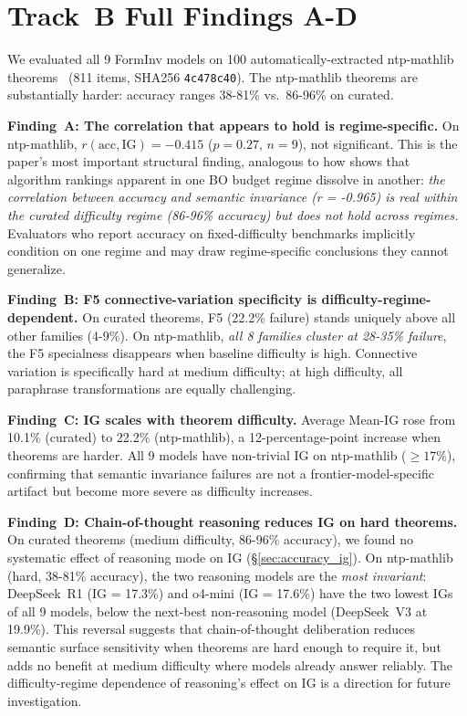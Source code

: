 \documentclass{article}
\begin{document}
\section{Track~B Full Findings A-D}
\label{app:trackb}

We evaluated all 9 FormInv models on 100 automatically-extracted ntp-mathlib theorems~\citep{hu2024minictx}
(811 items, SHA256 \texttt{4c478c40}).
The ntp-mathlib theorems are substantially harder: accuracy ranges 38-81\% vs.\ 86-96\% on curated.

\textbf{Finding~A: The correlation that appears to hold is regime-specific.}
On ntp-mathlib, $r(\text{acc}, \text{IG}) = -0.415$ ($p = 0.27$, $n=9$), not significant.
This is the paper's most important structural finding, analogous to how \citet{regimeeval2026} shows
that algorithm rankings apparent in one BO budget regime dissolve in another:
\emph{the correlation between accuracy and semantic invariance (r = -0.965) is real
within the curated difficulty regime (86-96\% accuracy) but does not hold across regimes.}
Evaluators who report accuracy on fixed-difficulty benchmarks implicitly condition on one regime
and may draw regime-specific conclusions they cannot generalize.

\textbf{Finding~B: F5 connective-variation specificity is difficulty-regime-dependent.}
On curated theorems, F5 (22.2\% failure) stands uniquely above all other families (4-9\%).
On ntp-mathlib, \emph{all 8 families cluster at 28-35\% failure}, the F5 specialness disappears
when baseline difficulty is high.
Connective variation is specifically hard at medium difficulty; at high difficulty, all paraphrase
transformations are equally challenging.

\textbf{Finding~C: IG scales with theorem difficulty.}
Average Mean-IG rose from 10.1\% (curated) to 22.2\% (ntp-mathlib), a 12-percentage-point
increase when theorems are harder.
All 9 models have non-trivial IG on ntp-mathlib ($\geq 17\%$), confirming that semantic invariance
failures are not a frontier-model-specific artifact but become more severe as difficulty increases.

\textbf{Finding~D: Chain-of-thought reasoning reduces IG on hard theorems.}
On curated theorems (medium difficulty, 86-96\% accuracy), we found no systematic effect
of reasoning mode on IG (\S\ref{sec:accuracy_ig}).
On ntp-mathlib (hard, 38-81\% accuracy), the two reasoning models are the \emph{most invariant}:
DeepSeek~R1 (IG = 17.3\%) and o4-mini (IG = 17.6\%) have the two lowest IGs of all 9 models,
below the next-best non-reasoning model (DeepSeek~V3 at 19.9\%).
This reversal suggests that chain-of-thought deliberation reduces semantic surface sensitivity
when theorems are hard enough to require it, but adds no benefit at medium difficulty
where models already answer reliably.
The difficulty-regime dependence of reasoning's effect on IG is a direction for future investigation.
\end{document}
